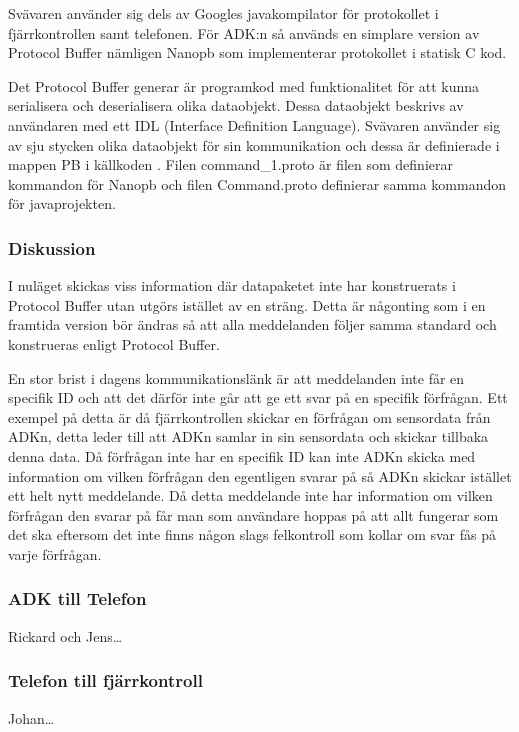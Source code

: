 Svävaren använder sig dels av Googles javakompilator för protokollet i 
fjärrkontrollen samt telefonen. För ADK:n så används en simplare version av
Protocol Buffer nämligen Nanopb \cite{Nanopb} som implementerar protokollet i
statisk C kod.

Det Protocol Buffer generar är programkod med funktionalitet för att kunna
serialisera och deserialisera olika dataobjekt. Dessa dataobjekt beskrivs av
användaren med ett IDL (Interface Definition Language).
Svävaren använder sig av sju stycken olika dataobjekt för sin kommunikation och
dessa är definierade i mappen PB i källkoden \cite{Source code}. Filen
command\_1.proto är filen som definierar kommandon för Nanopb och filen
Command.proto definierar samma kommandon för javaprojekten.

\subsubsection{Diskussion}
I nuläget skickas viss information där datapaketet inte har konstruerats i Protocol Buffer utan utgörs istället av 
en sträng. Detta är någonting som i en framtida version bör ändras så att alla meddelanden följer samma standard och 
konstrueras enligt Protocol Buffer. 

En stor brist i dagens kommunikationslänk är att meddelanden inte får en specifik ID och 
att det därför inte går att ge ett svar på en specifik förfrågan. Ett exempel på detta är då fjärrkontrollen skickar en 
förfrågan om sensordata från ADKn, detta leder till att ADKn samlar in sin sensordata och skickar tillbaka denna data. 
Då förfrågan inte har en specifik ID kan inte ADKn skicka med information om vilken förfrågan den egentligen svarar på 
så ADKn skickar istället ett helt nytt meddelande. Då detta meddelande inte har information om vilken förfrågan den svarar 
på får man som användare hoppas på att allt fungerar som det ska eftersom det inte finns någon slags felkontroll som kollar 
om svar fås på varje förfrågan.

\subsubsection{ADK till Telefon}
Rickard och Jens\ldots
\subsubsection{Telefon till fjärrkontroll}
Johan\ldots

